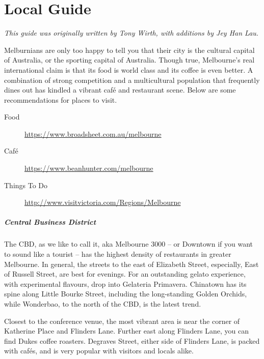 \chapter{Local Guide}
\thispagestyle{emptyheader}

\emph{This guide was originally written by Tony Wirth, with additions by 
  Jey Han Lau.}

Melburnians are only too happy to tell you that their city is the cultural
capital of Australia, or the sporting capital of Australia.
Though true, Melbourne's real international claim is that its food is 
world class and its coffee is even better.
A combination of strong competition and a multicultural
population that frequently dines out
has kindled a vibrant caf{\'e} and restaurant scene.
Below are some recommendations for places to visit.

\begin{description}
\item[Food] \url{https://www.broadsheet.com.au/melbourne}
\item[Caf{\'e}] \url{https://www.beanhunter.com/melbourne}
\item[Things To Do] \url{http://www.visitvictoria.com/Regions/Melbourne}
\end{description}



\paragraph{Central Business District}

The CBD, as we like to call it, aka Melbourne 3000 -- or Downtown if you want to
sound like a tourist -- has the highest density of restaurants in 
greater Melbourne. In general, the streets to the east of Elizabeth 
Street, especially, East of Russell Street, are best for evenings.
For an outstanding gelato experience, with experimental flavours, drop 
into Gelateria Primavera. Chinatown has its spine along Little Bourke 
Street, including the long-standing Golden Orchids, while Wonderbao, to 
the north of the CBD, is the latest trend.

Closest to the conference venue,
the most vibrant area
is near the corner of
Katherine Place and Flinders Lane.
Further east along Flinders Lane,
you can find Dukes coffee roasters.
Degraves Street, either side of Flinders Lane, is packed with caf{\'e}s,
and is very popular with visitors and locals alike.

